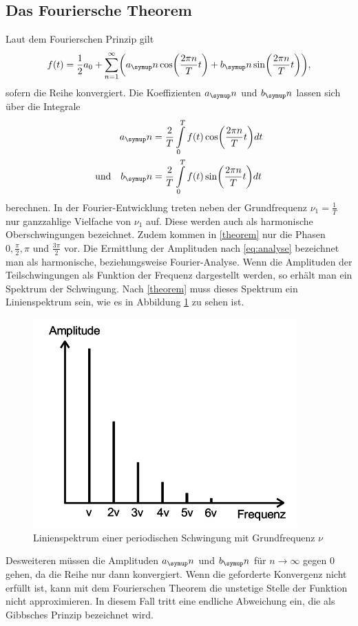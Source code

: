 \subsection{Das Fouriersche Theorem}
Laut dem Fourierschen Prinzip gilt
\begin{equation}
  f(t)=\frac{1}{2}a_0+\sum_{n=1}^\infty\biggl(a_\su{n}\cos\biggl(\frac{2\pi n}{T}t\biggr)
  +b_\su{n}\sin\biggl(\frac{2\pi n}{T}t\biggr)\biggr)
  \label{theorem} ,
\end{equation}
sofern die Reihe konvergiert. Die Koeffizienten $a_\su{n}$ und $b_\su{n}$
lassen sich über die Integrale
\begin{equation}
 \begin{split}
  a_\su{n} &= \frac{2}{T}\int\limits_{0}^{T} f(t)\cos\biggl(\frac{2\pi n}{T}t\biggr)dt \\
  \text{und}\quad b_\su{n} &= \frac{2}{T}\int\limits_{0}^{T} f(t)\sin\biggl(\frac{2\pi n}
  {T}t\biggr)dt
  \label{eq:analyse}
 \end{split}
\end{equation}
berechnen. In der Fourier-Entwicklung treten neben der Grundfrequenz
$\nu_1=\frac{1}{T}$ nur ganzzahlige Vielfache von $\nu_1$ auf. Diese werden auch
als harmonische Oberschwingungen bezeichnet. Zudem kommen in \eqref{theorem} nur
die Phasen $0, \frac{\pi}{2}, \pi$ und $\frac{3\pi}{2}$ vor.
Die Ermittlung der Amplituden nach \eqref{eq:analyse} bezeichnet man als
harmonische, beziehungsweise Fourier-Analyse.
\newpage
Wenn die Amplituden der
Teilschwingungen als Funktion der Frequenz dargestellt werden, so erhält man ein
Spektrum der Schwingung. Nach \eqref{theorem} muss dieses Spektrum ein
Linienspektrum sein, wie es in Abbildung \ref{spektrum} zu sehen ist.
\begin{figure}[H]
  \centering
  \includegraphics{bilder/linienspektrum.jpg}
  \caption{Linienspektrum einer periodischen Schwingung mit Grundfrequenz $\nu$
  \cite{351}}
  \label{spektrum}
\end{figure}
Desweiteren müssen die Amplituden $a_\su{n}$ und $b_\su{n}$ für
$n\rightarrow\infty$ gegen 0 gehen, da die Reihe nur dann konvergiert.
Wenn die geforderte Konvergenz nicht erfüllt ist, kann mit dem Fourierschen
Theorem die unstetige Stelle der Funktion nicht approximieren. In diesem Fall
tritt eine endliche Abweichung ein, die als Gibbsches Prinzip bezeichnet wird.

